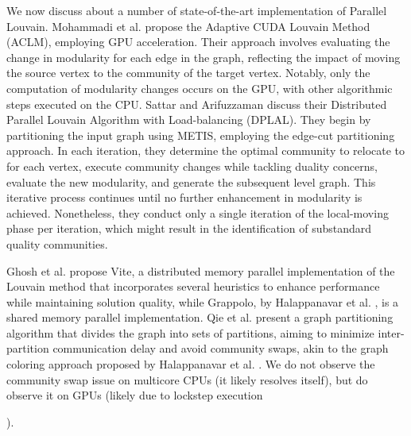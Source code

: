 We now discuss about a number of state-of-the-art implementation of Parallel Louvain. Mohammadi et al. \cite{com-mohammadi20} propose the Adaptive CUDA Louvain Method (ACLM), employing GPU acceleration. Their approach involves evaluating the change in modularity for each edge in the graph, reflecting the impact of moving the source vertex to the community of the target vertex. Notably, only the computation of modularity changes occurs on the GPU, with other algorithmic steps executed on the CPU. Sattar and Arifuzzaman \cite{sattar2022scalable} discuss their Distributed Parallel Louvain Algorithm with Load-balancing (DPLAL). They begin by partitioning the input graph using METIS, employing the edge-cut partitioning approach. In each iteration, they determine the optimal community to relocate to for each vertex, execute community changes while tackling duality concerns, evaluate the new modularity, and generate the subsequent level graph. This iterative process continues until no further enhancement in modularity is achieved. Nonetheless, they conduct only a single iteration of the local-moving phase per iteration, which might result in the identification of substandard quality communities. Ghosh et al. \cite{ghosh2018scalable} propose Vite, a distributed memory parallel implementation of the Louvain method that incorporates several heuristics to enhance performance while maintaining solution quality, while Grappolo, by Halappanavar et al. \cite{com-halappanavar17}, is a shared memory parallel implementation. Qie et al. \cite{qie2022isolate} present a graph partitioning algorithm that divides the graph into sets of partitions, aiming to minimize inter-partition communication delay and avoid community swaps, akin to the graph coloring approach proposed by Halappanavar et al. \cite{com-halappanavar17}. We do not observe the community swap issue on multicore CPUs (it likely resolves itself), but do observe it on GPUs (likely due to lockstep execution).

